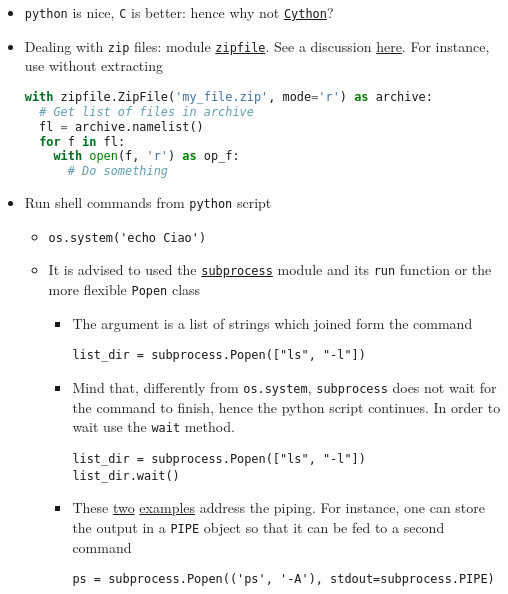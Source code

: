 \documentclass[a4paper,12pt,%
              final%
              ]{article}
\begin{document}
\begin{itemize}
\begin{itemize}
    \end{itemize}
  \item \texttt{python} is nice, \texttt{C} is better: hence why not \href{https://cython.readthedocs.io/en/latest/index.html}{\texttt{Cython}}?
  \item Dealing with \texttt{zip} files: module \href{https://docs.python.org/3/library/zipfile.html}{\texttt{zipfile}}. See a discussion \href{https://realpython.com/python-zipfile/}{here}. For instance, use without extracting
\begin{lstlisting}[language=python]
with zipfile.ZipFile('my_file.zip', mode='r') as archive:
  # Get list of files in archive
  fl = archive.namelist()
  for f in fl:
    with open(f, 'r') as op_f:
      # Do something
\end{lstlisting}
  \item Run shell commands from \texttt{python} script
    \begin{itemize}
      \item \verb|os.system('echo Ciao')|
      \item It is advised to used the \href{https://docs.python.org/3/library/subprocess.html#subprocess.Popen.communicate}{\texttt{subprocess}} module and its \texttt{run} function or the more flexible \texttt{Popen} class
        \begin{itemize}
          \item The argument is a list of strings which joined form the command
\begin{verbatim}
list_dir = subprocess.Popen(["ls", "-l"])
\end{verbatim}
          \item Mind that, differently from \verb|os.system|, \texttt{subprocess} does not wait for the command to finish, hence the python script continues. In order to wait use the \texttt{wait} method.
\begin{verbatim}
list_dir = subprocess.Popen(["ls", "-l"])
list_dir.wait()
\end{verbatim}
          \item These \href{https://stackoverflow.com/questions/13332268/how-to-use-subprocess-command-with-pipes}{two} \href{https://stackoverflow.com/questions/295459/how-do-i-use-subprocess-popen-to-connect-multiple-processes-by-pipes}{examples} address the piping. For instance, one can store the output in a \texttt{PIPE} object so that it can be fed to a second command
\begin{verbatim}
ps = subprocess.Popen(('ps', '-A'), stdout=subprocess.PIPE)

\end{verbatim}
\end{itemize}
\end{itemize}
\end{itemize}
\end{document}
